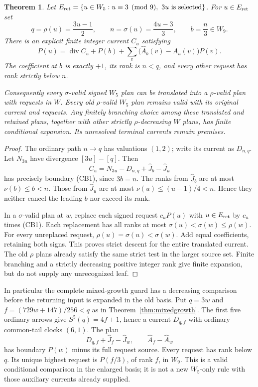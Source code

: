 \documentclass[11pt]{article}
\newtheorem{theorem}{Theorem}
\begin{document}
\begin{theorem}\label{thm:criticalbasis}
Let $E_{\rm ret}=\{u\in W_5:u\equiv3\pmod9,\ 3u\text{ is selected}\}$.
For $u\in E_{\rm ret}$ set
\[
 q=\rho(u)=\frac{3u-1}{2},\qquad
 n=\sigma(u)=\frac{4u-3}{3},\qquad b=\frac n3\in W_9.
\]
There is an explicit finite integer current $C_u$ satisfying
\[
 P(u)=\operatorname{div}C_u+P(b)
       +\sum_v\bigl(\widehat A_b(v)-\widehat A_u(v)\bigr)P(v).
 \tag{CB1}
\]
The coefficient at $b$ is exactly $+1$, its rank is $n<q$, and
every other request has rank strictly below $n$.

Consequently every $\sigma$-valid signed $W_5$ plan can be translated
into a $\rho$-valid plan with requests in $W$. Every old $\rho$-valid
$W_5$ plan remains valid with its original current and requests.
Any finitely branching choice among these translated and retained plans,
together with other strictly $\rho$-decreasing $W$ plans, has finite
conditional expansion. Its unresolved terminal currents remain premises.
\end{theorem}
\begin{proof}
The ordinary path $n\to q$ has valuations $(1,2)$; write its current
as $D_{n,q}$. Let $N_{3u}$ have divergence $[3u]-[q]$.
Then
\[
 C_u=N_{3u}-D_{n,q}+\widehat J_b-\widehat J_u
\]
has precisely boundary (CB1), since $3b=n$.
The ranks from $\widehat J_b$ are at most $\nu(b)\le b<n$.
Those from $\widehat J_u$ are at most
$\nu(u)\le(u-1)/4<n$. Hence they neither cancel the leading $b$
nor exceed its rank.

In a $\sigma$-valid plan at $w$, replace each signed request
$c_uP(u)$ with $u\in E_{\rm ret}$ by $c_u$ times (CB1).
Each replacement has all ranks at most $\sigma(u)<\sigma(w)\le\rho(w)$.
For every unreplaced request, $\rho(u)=\sigma(u)<\sigma(w)$.
Add equal coefficients, retaining both signs. This proves strict descent
for the entire translated current. The old $\rho$ plans already satisfy
the same strict test in the larger source set. Finite branching and a
strictly decreasing positive integer rank give finite expansion, but do
not supply any unrecognized leaf.
\end{proof}

In particular the complete mixed-growth guard has a decreasing comparison
before the returning input is expanded in the old basis. Put $q=3w$ and
$f=(729w+147)/256<q$ as in Theorem~\ref{thm:mixedgrowth}.
The first five ordinary arrows give $S^5(q)=4f+1$, hence a current
$D_{q,f}$ with ordinary common-tail clocks $(6,1)$. The plan
\[
 D_{q,f}+\widehat J_f-\widehat J_w,
 \qquad \widehat A_f-\widehat A_w
\]
has boundary $P(w)$ minus its full request source. Every request has
rank below $q$. Its unique highest request is $P(f/3)$, of rank $f$,
in $W_9$. This is a valid conditional comparison in the enlarged basis;
it is not a new $W_5$-only rule with those auxiliary currents already supplied.
\end{document}
